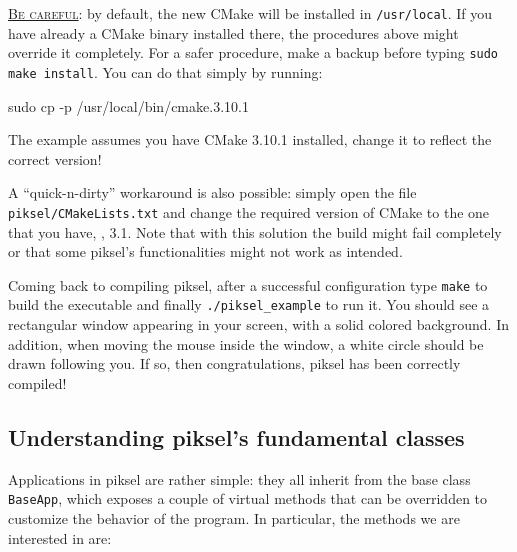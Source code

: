 \documentclass{article}
\begin{document}
\begin{mdframed}[hidealllines=true,backgroundcolor=red!20]
  \underline{\textsc{Be careful}}: by default, the new CMake will be installed in \texttt{/usr/local}. If you have already a CMake binary installed there, the procedures above might override it completely. For a safer procedure, make a backup before typing \texttt{sudo make install}. You can do that simply by running:
  \begin{center}
    \ttfamily
    sudo cp -p /usr/local/bin/cmake.3.10.1
  \end{center}
  The example assumes you have CMake 3.10.1 installed, change it to reflect the correct version!
\end{mdframed}

A ``quick-n-dirty'' workaround is also possible: simply open the file \texttt{piksel/CMakeLists.txt} and change the required version of CMake to the one that you have, \eg, 3.1. Note that with this solution the build might fail completely or that some piksel's functionalities might not work as intended.

Coming back to compiling piksel, after a successful configuration type \texttt{make} to build the executable and finally \texttt{./piksel\_example} to run it. You should see a rectangular window appearing in your screen, with a solid colored background. In addition, when moving the mouse inside the window, a white circle should be drawn following you. If so, then congratulations, piksel has been correctly compiled!




\subsection{Understanding piksel's fundamental classes}

Applications in piksel are rather simple: they all inherit from the base class \texttt{BaseApp}, which exposes a couple of virtual methods that can be overridden to customize the behavior of the program. In particular, the methods we are interested in are:
\end{document}
